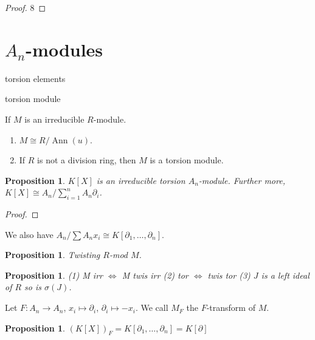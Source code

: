 \documentclass{article}
\newtheorem{proposition}[theorem]{Proposition}
\begin{document}
\begin{proof} 
8
\end{proof}

\section{$ A_n $-modules}

\begin{definition} 
torsion elements
\end{definition}

\begin{definition} 
torsion module
\end{definition}

\begin{lemma}
If $ M $ is an irreducible $ R $-module.
\begin{enumerate}
    \item $ M \cong R/\operatorname{Ann}(u) $.
    \item If $ R $ is not a division ring, then $ M $ is a torsion module.
\end{enumerate}
\end{lemma}

\begin{proposition}
$ K[X] $ is an irreducible torsion $ A_n $-module. Further more, $ K[X] \cong A_n / \sum_{i=1}^n A_n \partial_i $. 
\end{proposition}

\begin{proof} 

\end{proof}

We also have $ A_n/ \sum A_n x_i \cong K[\partial_1, \ldots, \partial_n]$.

\begin{proposition}
Twisting $ R $-mod $ M $.  
\end{proposition}

\begin{proposition}
(1) M irr $ \Leftrightarrow $ M twis irr 
(2) tor $ \Leftrightarrow $ twis tor
(3) $ J $ is a left ideal of $ R $ so is $ \sigma(J) $.   
\end{proposition}

Let $ F: A_n \to A_n $, $ x_i \mapsto \partial_i $, $ \partial_i \mapsto -x_i $. We call $ M_F $ the $ F $-transform of $ M $.

\begin{proposition}
$ (K[X])_F=K[\partial_1, \ldots, \partial_n]=K[\partial] $ 
\end{proposition}
\end{document}
